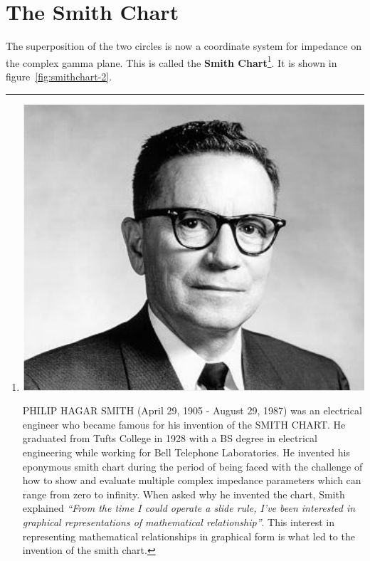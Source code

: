 \section{The Smith Chart}
The superposition of the two circles is now a coordinate system for impedance on the complex gamma plane. This is called the \textbf{Smith Chart}\footnote{
\includegraphics[scale=0.09]{./graphics/a21}

PHILIP HAGAR SMITH (April 29, 1905 - August 29, 1987) was an electrical engineer who became famous for his invention of the SMITH CHART. He graduated from Tufts College in 1928 with a BS degree in electrical engineering while working for Bell Telephone Laboratories. He invented his eponymous smith chart during the period of being faced with the challenge of how to show and evaluate multiple complex impedance parameters which can range from zero to infinity. When asked why he invented the chart, Smith explained \emph{\textquotedblleft From the time I could operate a slide rule, I've been interested in graphical representations of mathematical relationship\textquotedblright}. This interest in representing mathematical relationships in graphical form is what led to the invention of the smith chart.
}. It is shown in figure~\ref{fig:smithchart-2}.
